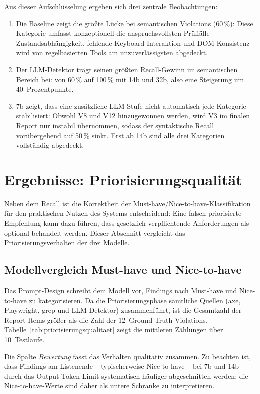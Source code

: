 Aus dieser Aufschlüsselung ergeben sich drei zentrale Beobachtungen:
\begin{enumerate}
    \item Die Baseline zeigt die größte Lücke bei semantischen Violations (60\,\%): Diese Kategorie umfasst konzeptionell die anspruchsvollsten Prüffälle -- Zustandsabhängigkeit, fehlende Keyboard-Interaktion und \ac{DOM}-Konsistenz -- wird von regelbasierten Tools am unzuverlässigsten abgedeckt.
    \item Der \ac{LLM}-Detektor trägt seinen größten Recall-Gewinn im semantischen Bereich bei: von 60\,\% auf 100\,\% mit 14b und 32b, also eine Steigerung um 40~Prozentpunkte.
    \item 7b zeigt, dass eine zusätzliche \ac{LLM}-Stufe nicht automatisch jede Kategorie stabilisiert: Obwohl V8 und V12 hinzugewonnen werden, wird V3 im finalen Report nur instabil übernommen, sodass der syntaktische Recall vorübergehend auf 50\,\% sinkt. Erst ab 14b sind alle drei Kategorien vollständig abgedeckt.
\end{enumerate}

\section{Ergebnisse: Priorisierungsqualität}
\label{sec:ergebnisse_priorisierung}

Neben dem Recall ist die Korrektheit der Must-have/Nice-to-have-Klassifikation für den praktischen Nutzen des Systems entscheidend: Eine falsch priorisierte Empfehlung kann dazu führen, dass gesetzlich verpflichtende Anforderungen als optional behandelt werden. Dieser Abschnitt vergleicht das Priorisierungsverhalten der drei Modelle.

\subsection{Modellvergleich Must-have und Nice-to-have}
\label{sec:prio_modellvergleich}

Das Prompt-Design schreibt dem Modell vor, Findings nach Must-have und Nice-to-have zu kategorisieren. Da die Priorisierungsphase sämtliche Quellen (axe, Playwright, grep und \ac{LLM}-Detektor) zusammenführt, ist die Gesamtzahl der Report-Items größer als die Zahl der 12~Ground-Truth-Violations. Tabelle~\ref{tab:priorisierungsqualitaet} zeigt die mittleren Zählungen über 10~Testläufe.

Die Spalte \textit{Bewertung} fasst das Verhalten qualitativ zusammen. Zu beachten ist, dass Findings am Listenende -- typischerweise Nice-to-have -- bei 7b und 14b durch das Output-Token-Limit systematisch häufiger abgeschnitten werden; die Nice-to-have-Werte sind daher als untere Schranke zu interpretieren.

